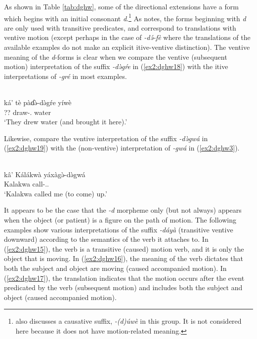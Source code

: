 As shown in Table \ref{tab:dghw}, some of the directional extensions have a form which begins with an initial consonant \textit{d}.\footnote{\citet[19]{frickVerbalSystemDghwede1978} also discusses a causative suffix, \textit{-(d)úwè} in this group. It is not considered here because it does not have motion-related meaning.} As \citet[19]{frickVerbalSystemDghwede1978} notes, the forms beginning with \textit{d} are only used with transitive predicates, and correspond to translations with ventive motion (except perhaps in the case of \textit{-də́-fè} where the translations of the available examples do not make an explicit itive-ventive distinction). The ventive meaning of the \textit{d}-forms is clear when we compare the ventive (subsequent motion) interpretation of the suffix \textit{-də̀gŕe} in (\ref{ex2:dghw18}) with the itive interpretations of \textit{-gré} in most examples. 

\ea\label{ex2:dghw18}
 \\
\gll  ká' tè pàɗə̀-də̀gŕe yíwè \\
 ?? draw-. water \\
\glt `They drew water (and brought it here).'
\z 

Likewise, compare the ventive interpretation of the suffix \textit{-də̀gwá} in (\ref{ex2:dghw19}) with the (non-ventive) interpretation of \textit{-gwá} in (\ref{ex2:dghw3}).

\ea\label{ex2:dghw19}
 \\
\gll  kâ' Kálákwà yáxàgə̀-də̀gwá \\
 Kalakwa call-.. \\
\glt `Kalakwa called me (to come) up.'
\z 

It appears to be the case that the \textit{-d} morpheme only (but not always) appears when the object (or patient) is a figure on the path of motion. The following examples show various interpretations of the suffix \textit{-dáyà} (transitive ventive downward) according to the semantics of the verb it attaches to. In (\ref{ex2:dghw15}), the verb is a transitive (caused) motion verb, and it is only the object that is moving. In (\ref{ex2:dghw16}), the meaning of the verb dictates that both the subject and object are moving (caused accompanied motion). In (\ref{ex2:dghw17}), the translation indicates that the motion occurs after the event predicated by the verb (subsequent motion) and includes both the subject and object (caused accompanied motion). 

